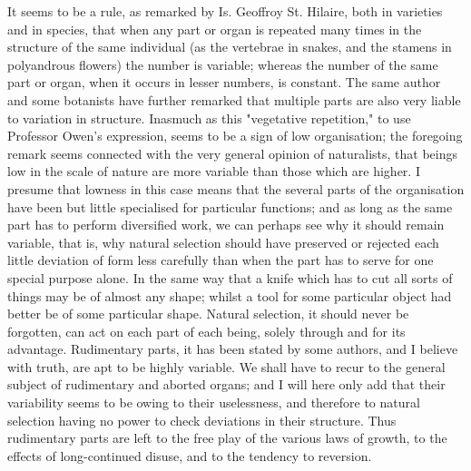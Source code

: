 It seems to be a rule, as remarked by Is. Geoffroy St. Hilaire, both in varieties and in species, that when any part or organ is repeated many times in the structure of the same individual (as the vertebrae in snakes, and the stamens in polyandrous flowers) the number is variable; whereas the number of the same part or organ, when it occurs in lesser numbers, is constant. The same author and some botanists have further remarked that multiple parts are also very liable to variation in structure. Inasmuch as this "vegetative repetition," to use Professor Owen's expression, seems to be a sign of low organisation; the foregoing remark seems connected with the very general opinion of naturalists, that beings low in the scale of nature are more variable than those which are higher. I presume that lowness in this case means that the several parts of the organisation have been but little specialised for particular functions; and as long as the same part has to perform diversified work, we can perhaps see why it should remain variable, that is, why natural selection should have preserved or rejected each little deviation of form less carefully than when the part has to serve for one special purpose alone. In the same way that a knife which has to cut all sorts of things may be of almost any shape; whilst a tool for some particular object had better be of some particular shape. Natural selection, it should never be forgotten, can act on each part of each being, solely through and for its advantage.
Rudimentary parts, it has been stated by some authors, and I believe with truth, are apt to be highly variable. We shall have to recur to the general subject of rudimentary and aborted organs; and I will here only add that their variability seems to be owing to their uselessness, and therefore to natural selection having no power to check deviations in their structure. Thus rudimentary parts are left to the free play of the various laws of growth, to the effects of long-continued disuse, and to the tendency to reversion.

